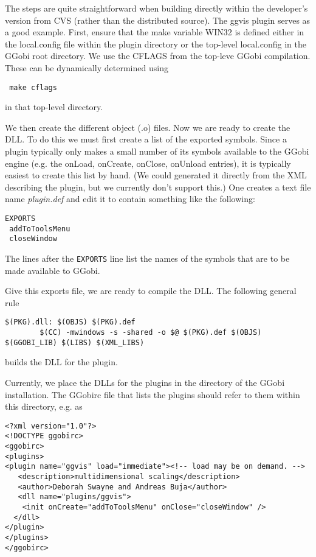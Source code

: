 \documentclass{article}
\begin{document}
The steps are quite straightforward when building directly within the
developer's version from CVS (rather than the distributed source).
The ggvis plugin serves as a good example.  First, ensure that the
make variable WIN32 is defined either in the local.config file within
the plugin directory or the top-level local.config in the GGobi root
directory.  We use the CFLAGS from the top-leve GGobi
compilation. These can be dynamically determined using
\begin{verbatim}
 make cflags
\end{verbatim}
in that top-level directory.

We then create the different object (.o) files.  Now we are ready to
create the DLL. To do this we must first create a list of the exported
symbols. Since a plugin typically only makes a small number of its
symbols available to the GGobi engine (e.g. the onLoad, onCreate,
onClose, onUnload entries), it is typically easiest to create this
list by hand. (We could generated it directly from the XML describing
the plugin, but we currently don't support this.)
One creates a text file name \textit{plugin.def}
and edit it to contain something like the following:
\begin{verbatim}
EXPORTS
 addToToolsMenu
 closeWindow
\end{verbatim}
The lines after the \verb+EXPORTS+ line 
list the names of the symbols that are to be made available
to GGobi.

Give this exports file, we are ready to compile the DLL.
The following general rule 
\begin{verbatim}
$(PKG).dll: $(OBJS) $(PKG).def
        $(CC) -mwindows -s -shared -o $@ $(PKG).def $(OBJS) $(GGOBI_LIB) $(LIBS) $(XML_LIBS) 
\end{verbatim}
builds the DLL for the plugin.

Currently, we place the DLLs for the plugins in the 
 directory of the GGobi installation.
The GGobirc file that lists the plugins should refer
to them within this directory, e.g. as
\begin{verbatim}
<?xml version="1.0"?>
<!DOCTYPE ggobirc>
<ggobirc>
<plugins>
<plugin name="ggvis" load="immediate"><!-- load may be on demand. -->
   <description>multidimensional scaling</description>
   <author>Deborah Swayne and Andreas Buja</author>
   <dll name="plugins/ggvis">
    <init onCreate="addToToolsMenu" onClose="closeWindow" />
  </dll>
</plugin>
</plugins>
</ggobirc>
\end{verbatim}
\end{document}

